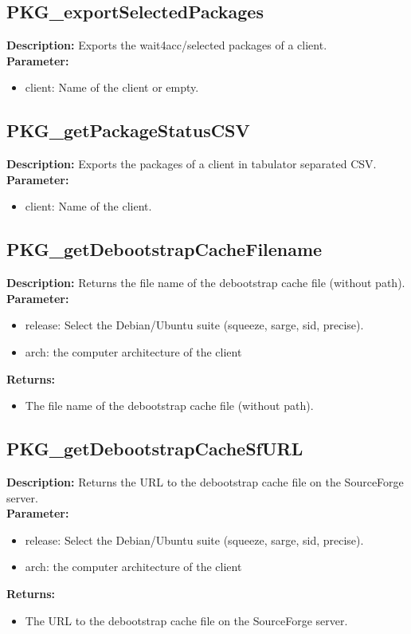\subsection{PKG\_exportSelectedPackages}
\textbf{Description:} Exports the wait4acc/selected packages of a client.\\
\textbf{Parameter:}
\begin{itemize}
\item client: Name of the client or empty.
\end{itemize}

\subsection{PKG\_getPackageStatusCSV}
\textbf{Description:} Exports the packages of a client in tabulator separated CSV.\\
\textbf{Parameter:}
\begin{itemize}
\item client: Name of the client.
\end{itemize}

\subsection{PKG\_getDebootstrapCacheFilename}
\textbf{Description:} Returns the file name of the debootstrap cache file (without path).\\
\textbf{Parameter:}
\begin{itemize}
\item release: Select the Debian/Ubuntu suite (squeeze, sarge, sid, precise).
\item arch: the computer architecture of the client
\end{itemize}
\textbf{Returns:}
\begin{itemize}
\item The file name of the debootstrap cache file (without path).
\end{itemize}

\subsection{PKG\_getDebootstrapCacheSfURL}
\textbf{Description:} Returns the URL to the debootstrap cache file on the SourceForge server.\\
\textbf{Parameter:}
\begin{itemize}
\item release: Select the Debian/Ubuntu suite (squeeze, sarge, sid, precise).
\item arch: the computer architecture of the client
\end{itemize}
\textbf{Returns:}
\begin{itemize}
\item The URL to the debootstrap cache file on the SourceForge server.
\end{itemize}


